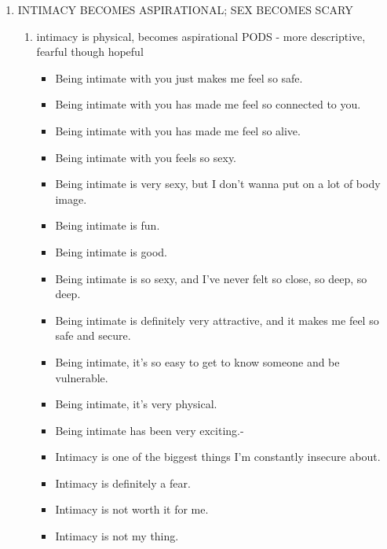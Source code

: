 \documentclass[11pt]{article}
\begin{document}
\begin{enumerate}
\item INTIMACY BECOMES ASPIRATIONAL; SEX BECOMES SCARY
\label{sec:org325d1c1}
\begin{enumerate}
\item intimacy is physical, becomes aspirational
\label{sec:orgd80d0be}
PODS - more descriptive, fearful though hopeful
\begin{itemize}
\item Being intimate with you just makes me feel so safe.
\item Being intimate with you has made me feel so connected to you.
\item Being intimate with you has made me feel so alive.
\item Being intimate with you feels so sexy.
\item Being intimate is very sexy, but I don't wanna put on a lot of body
image.
\item Being intimate is fun.
\item Being intimate is good.
\item Being intimate is so sexy, and I've never felt so close, so deep, so
deep.
\item Being intimate is definitely very attractive, and it makes me feel
so safe and secure.
\item Being intimate, it's so easy to get to know someone and be
vulnerable.
\item Being intimate, it's very physical.
\item Being intimate has been very exciting.-
\item Intimacy is one of the biggest things I'm constantly insecure about.
\item Intimacy is definitely a fear.
\item Intimacy is not worth it for me.
\item Intimacy is not my thing.
\end{itemize}



\end{enumerate}
\end{enumerate}
\end{document}
